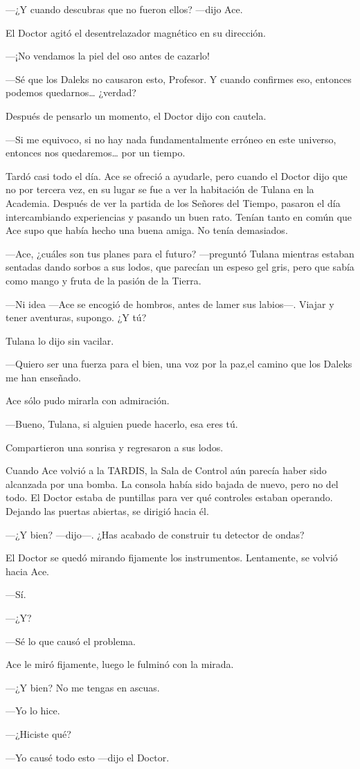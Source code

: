 ---¿Y cuando descubras que no fueron ellos? ---dijo Ace.

El Doctor agitó el desentrelazador magnético en su dirección.

---¡No vendamos la piel del oso antes de cazarlo!

---Sé que los Daleks no causaron esto, Profesor. Y cuando
confirmes eso, entonces podemos quedarnos\ldots{} ¿verdad?

Después de pensarlo un momento, el Doctor dijo con cautela.

---Si me equivoco, si no hay nada fundamentalmente erróneo en
este universo, entonces nos quedaremos\ldots{} por un tiempo.

Tardó casi todo el día. Ace se ofreció a ayudarle, pero cuando
el Doctor dijo que no por tercera vez, en su lugar se fue a ver la
habitación de Tulana en la Academia. Después de ver la partida de los
Señores del Tiempo, pasaron el día intercambiando experiencias y pasando
un buen rato. Tenían tanto en común que Ace supo que había hecho una
buena amiga. No tenía demasiados.

---Ace, ¿cuáles son tus planes para el futuro? ---preguntó
Tulana mientras estaban sentadas dando sorbos a sus lodos, que parecían
un espeso gel gris, pero que sabía como mango y fruta de la pasión de la
Tierra.

---Ni idea ---Ace se encogió de hombros, antes de lamer sus
labios---. Viajar y tener aventuras, supongo. ¿Y tú?

Tulana lo dijo sin vacilar.

---Quiero ser una fuerza para el bien, una voz por la paz,el
camino que los Daleks me han enseñado.

Ace sólo pudo mirarla con admiración.

---Bueno, Tulana, si alguien puede hacerlo, esa eres tú.

Compartieron una sonrisa y regresaron a sus lodos.

Cuando Ace volvió a la TARDIS, la Sala de Control aún parecía
haber sido alcanzada por una bomba. La consola había sido bajada de
nuevo, pero no del todo. El Doctor estaba de puntillas para ver qué
controles estaban operando. Dejando las puertas abiertas, se dirigió
hacia él.

---¿Y bien? ---dijo---. ¿Has acabado de construir tu detector de
ondas?

El Doctor se quedó mirando fijamente los instrumentos.
Lentamente, se volvió hacia Ace. 

---Sí.

---¿Y?

---Sé lo que causó el problema.

Ace le miró fijamente, luego le fulminó con la mirada.

---¿Y bien? No me tengas en ascuas.

---Yo lo hice.

---¿Hiciste qué?

---Yo causé todo esto ---dijo el Doctor.